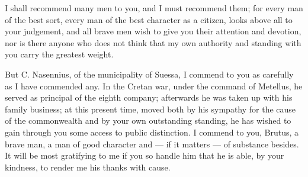 

 I shall recommend many men to you, and I must recommend them; for every man of the best sort, every man of the best character as a citizen, looks above all to your judgement, and all brave men wish to give you their attention and devotion, nor is there anyone who does not think that my own authority and standing with you carry the greatest weight.

 But C. Nasennius, of the municipality of Suessa, I commend to you as carefully as I have commended any. In the Cretan war, under the command of Metellus, he served as principal of the eighth company; afterwards he was taken up with his family business; at this present time, moved both by his sympathy for the cause of the commonwealth and by your own outstanding standing, he has wished to gain through you some access to public distinction. I commend to you, Brutus, a brave man, a man of good character and --- if it matters --- of substance besides. It will be most gratifying to me if you so handle him that he is able, by your kindness, to render me his thanks with cause.
